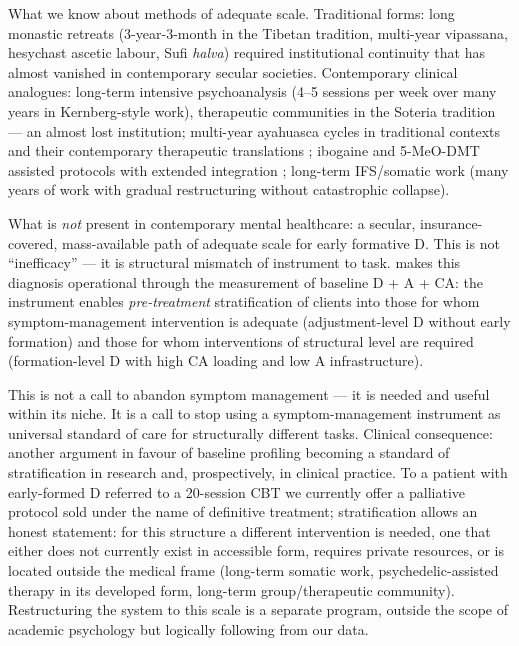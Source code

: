 What we know about methods of adequate scale. Traditional forms: long monastic retreats (3-year-3-month in the Tibetan tradition, multi-year vipassana, hesychast ascetic labour, Sufi \textit{halva}) required institutional continuity that has almost vanished in contemporary secular societies. Contemporary clinical analogues: long-term intensive psychoanalysis (4--5 sessions per week over many years in Kernberg-style work), therapeutic communities in the Soteria tradition \citep{mosher1999} --- an almost lost institution; multi-year ayahuasca cycles in traditional contexts and their contemporary therapeutic translations \citep[see][in a ceremonial framework]{nielson2018}; ibogaine and 5-MeO-DMT assisted protocols with extended integration \citep[in Mexico/Netherlands, see the review by][]{brown2019}; long-term IFS/somatic work (many years of work with gradual restructuring without catastrophic collapse).

What is \emph{not} present in contemporary mental healthcare: a secular, insurance-covered, mass-available path of adequate scale for early formative D. This is not ``inefficacy'' --- it is structural mismatch of instrument to task. \DEIC{} makes this diagnosis operational through the measurement of baseline D + A + CA: the instrument enables \emph{pre-treatment} stratification of clients into those for whom symptom-management intervention is adequate (adjustment-level D without early formation) and those for whom interventions of structural level are required (formation-level D with high CA loading and low A infrastructure).

This is not a call to abandon symptom management --- it is needed and useful within its niche. It is a call to stop using a symptom-management instrument as universal standard of care for structurally different tasks. Clinical consequence: another argument in favour of baseline \DEIC{} profiling becoming a standard of stratification in research and, prospectively, in clinical practice. To a patient with early-formed D referred to a 20-session CBT we currently offer a palliative protocol sold under the name of definitive treatment; \DEIC{} stratification allows an honest statement: for this structure a different intervention is needed, one that either does not currently exist in accessible form, requires private resources, or is located outside the medical frame (long-term somatic work, psychedelic-assisted therapy in its developed form, long-term group/therapeutic community). Restructuring the system to this scale is a separate program, outside the scope of academic psychology but logically following from our data.

